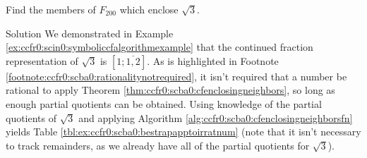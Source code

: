 \begin{vworkexamplestatement}
\label{ex:ccfr0:scba0:bestrapapptoirratnum}
Find the members of $F_{200}$ which 
enclose $\sqrt{3}$.
\end{vworkexamplestatement}
\begin{vworkexampleparsection}{Solution}
We demonstrated in Example 
\ref{ex:ccfr0:scin0:symboliccfalgorithmexample}
that the continued fraction representation of 
$\sqrt{3}$ is $[1;\overline{1,2}]$.
As is highlighted in Footnote 
\ref{footnote:ccfr0:scba0:rationalitynotrequired}, it isn't required 
that a number be rational to apply Theorem
\ref{thm:ccfr0:scba0:cfenclosingneighbors}, so long as
enough partial quotients can be obtained.
Using knowledge of the partial quotients of
$\sqrt{3}$ and applying Algorithm \ref{alg:ccfr0:scba0:cfenclosingneighborsfn}
yields Table \ref{tbl:ex:ccfr0:scba0:bestrapapptoirratnum} (note that it isn't necessary
to track remainders, as we already have all of the partial quotients for
$\sqrt{3}$).


\end{vworkexampleparsection}

